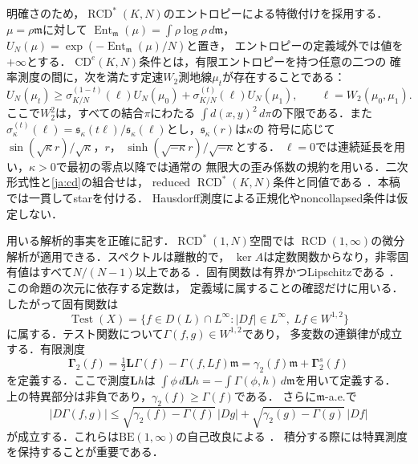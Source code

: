 \documentclass[12pt]{amsart}
\theoremstyle{definition}
\theoremstyle{remark}
\numberwithin{equation}{section}
\DeclareMathOperator{\Ent}{Ent}
\newcommand{\RCD}{\operatorname{RCD}^{*}}
\newcommand{\Test}{\operatorname{Test}}
\newcommand{\dm}{\,d\mathfrak m}
\theoremstyle{plain}
\begin{document}
明確さのため，$\RCD(K,N)$のエントロピーによる特徴付けを採用する．
$\mu=\rho\mathfrak m$に対して
$\Ent_{\mathfrak m}(\mu)=\int\rho\log\rho\dm$，
$U_N(\mu)=\exp(-\Ent_{\mathfrak m}(\mu)/N)$と置き，
エントロピーの定義域外では値を$+\infty$とする．
$\mathrm{CD}^{e}(K,N)$条件とは，有限エントロピーを持つ任意の二つの
確率測度の間に，次を満たす定速$W_2$測地線$\mu_t$が存在することである：
\begin{equation}\label{ja:cd}
 U_N(\mu_t)\geq
 \sigma_{K/N}^{(1-t)}(\ell)U_N(\mu_0)
 +\sigma_{K/N}^{(t)}(\ell)U_N(\mu_1),
 \qquad \ell=W_2(\mu_0,\mu_1).
\end{equation}
ここで$W_2^2$は，すべての結合$\pi$にわたる
$\int d(x,y)^2\,d\pi$の下限である．また
$\sigma_\kappa^{(t)}(\ell)=\mathfrak s_\kappa(t\ell)/
\mathfrak s_\kappa(\ell)$とし，$\mathfrak s_\kappa(r)$は$\kappa$の
符号に応じて$\sin(\sqrt\kappa r)/\sqrt\kappa$，$r$，
$\sinh(\sqrt{-\kappa}r)/\sqrt{-\kappa}$とする．
$\ell=0$では連続延長を用い，$\kappa>0$で最初の零点以降では通常の
無限大の歪み係数の規約を用いる．二次形式性と\eqref{ja:cd}の組合せは，
reduced $\operatorname{RCD}^{*}(K,N)$条件と同値である
\cite[Theorem 3.17]{ja:EKS}．本稿では一貫してstarを付ける．
Hausdorff測度による正規化やnoncollapsed条件は仮定しない．

用いる解析的事実を正確に記す．$\RCD(1,N)$空間では
$\operatorname{RCD}(1,\infty)$の微分解析が適用できる．スペクトルは離散的で，
$\ker A$は定数関数からなり，非零固有値はすべて$N/(N-1)$以上である
\cite[Theorem 4.22]{ja:EKS}．固有関数は有界かつLipschitzである
\cite[Proposition 7.1]{ja:AHPT}．この命題の次元に依存する定数は，
定義域に属することの確認だけに用いる．したがって固有関数は
\[
 \Test(X)=\{f\in D(L)\cap L^\infty:
       |Df|\in L^\infty,\ Lf\in W^{1,2}\}
\]
に属する．テスト関数について$\Gamma(f,g)\in W^{1,2}$であり，
多変数の連鎖律が成立する．有限測度
\[
 \boldsymbol\Gamma_2(f)=\tfrac12\boldsymbol L\Gamma(f)
                         -\Gamma(f,Lf)\mathfrak m
 =\gamma_2(f)\mathfrak m+\boldsymbol\Gamma_2^s(f)
\]
を定義する．ここで測度$\boldsymbol Lh$は
$\int\phi\,d\boldsymbol Lh=-\int\Gamma(\phi,h)\dm$を用いて定義する．
上の特異部分は非負であり，$\gamma_2(f)\geq\Gamma(f)$である．
さらに$\mathfrak m$-a.e.で
\begin{equation}\label{ja:selfimprove}
 |D\Gamma(f,g)|\leq
 \sqrt{\gamma_2(f)-\Gamma(f)}\,|Dg|
 +\sqrt{\gamma_2(g)-\Gamma(g)}\,|Df|
\end{equation}
が成立する．これらは$\mathrm{BE}(1,\infty)$の自己改良による
\cite[Lemma 3.2 and Theorem 3.4, (3.16)]{ja:S}．
積分する際には特異測度を保持することが重要である．
\end{document}

